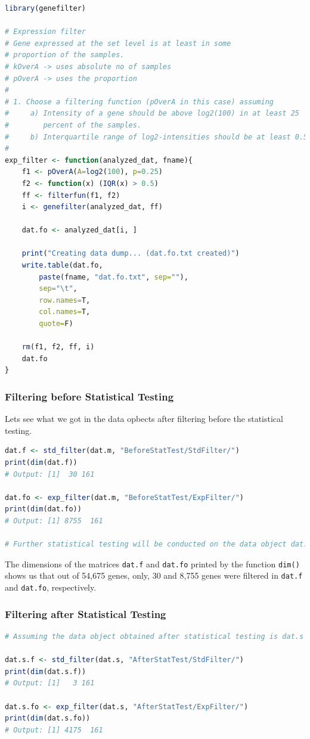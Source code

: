 \documentclass[oneside, a4paper, 11pt]{book}
\begin{document}
\begin{lstlisting}[language=R, caption=Expression Filtering]
library(genefilter)

# Expression filter
# Gene expressed at the set level is at least in some
# proportion of the samples.
# kOverA -> uses absolute no of samples
# pOverA -> uses the proportion
#
# 1. Choose a filtering function (pOverA in this case) assuming
#     a) Intensity of a gene should be above log2(100) in at least 25
#        percent of the samples.
#     b) Interquartile range of log2-intensities should be at least 0.5
#
exp_filter <- function(analyzed_dat, fname){
    f1 <- pOverA(A=log2(100), p=0.25)
    f2 <- function(x) (IQR(x) > 0.5)
    ff <- filterfun(f1, f2)
    i <- genefilter(analyzed_dat, ff)

    dat.fo <- analyzed_dat[i, ]

    print("Creating data dump... (dat.fo.txt created)")
    write.table(dat.fo,
        paste(fname, "dat.fo.txt", sep=""),
        sep="\t",
        row.names=T,
        col.names=T,
        quote=F)

    rm(f1, f2, ff, i)
    dat.fo
}

\end{lstlisting}

\subsubsection{Filtering before Statistical Testing}
Lets see what we got in the data opbects after filtering before the statistical testing.

\begin{lstlisting}[language=R, caption=Filtering before Statistical Testing]
dat.f <- std_filter(dat.m, "BeforeStatTest/StdFilter/")
print(dim(dat.f))
# Output: [1]  30 161

dat.fo <- exp_filter(dat.m, "BeforeStatTest/ExpFilter/")
print(dim(dat.fo))
# Output: [1] 8755  161

# Further statistical testing will be conducted on the data object dat.f and dat.fo.
\end{lstlisting}

The dimensions of the matrices \texttt{dat.f} and \texttt{dat.fo} printed by the function \texttt{dim()} shows us that out of 54,675 genes, only, 30 and 8,755 genes were filtered in \texttt{dat.f} and \texttt{dat.fo}, respectively.

\subsubsection{Filtering after Statistical Testing}
\begin{lstlisting}[language=R, caption=Filtering after Statistical Testing]
# Assuming the data object obtained after statistical testing is dat.s

dat.s.f <- std_filter(dat.s, "AfterStatTest/StdFilter/")
print(dim(dat.s.f))
# Output: [1]   3 161

dat.s.fo <- exp_filter(dat.s, "AfterStatTest/ExpFilter/")
print(dim(dat.s.fo))
# Output: [1] 4175  161

\end{lstlisting}
\end{document}
